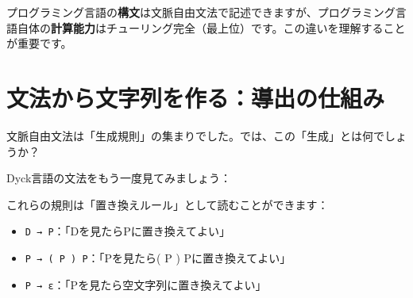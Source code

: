 \begin{center}
\end{center}

プログラミング言語の\textbf{構文}は文脈自由文法で記述できますが、プログラミング言語自体の\textbf{計算能力}はチューリング完全（最上位）です。この違いを理解することが重要です。

\hypertarget{chapter4-ux6587ux6cd5ux304bux3089ux6587ux5b57ux5217ux3092ux4f5cux308bux5c0eux51faux306eux4ed5ux7d44ux307f}{%
\section{文法から文字列を作る：導出の仕組み}\label{chapter4-ux6587ux6cd5ux304bux3089ux6587ux5b57ux5217ux3092ux4f5cux308bux5c0eux51faux306eux4ed5ux7d44ux307f}}

文脈自由文法は「生成規則」の集まりでした。では、この「生成」とは何でしょうか？

Dyck言語の文法をもう一度見てみましょう：

\begin{Shaded}
\begin{Highlighting}[]
\end{Highlighting}
\end{Shaded}

これらの規則は「置き換えルール」として読むことができます：

\begin{itemize}
\tightlist
\item
  \texttt{D\ →\ P}：「Dを見たらPに置き換えてよい」
\item
  \texttt{P\ →\ (\ P\ )\ P}：「Pを見たら( P ) Pに置き換えてよい」
\item
  \texttt{P\ →\ ε}：「Pを見たら空文字列に置き換えてよい」
\end{itemize}

